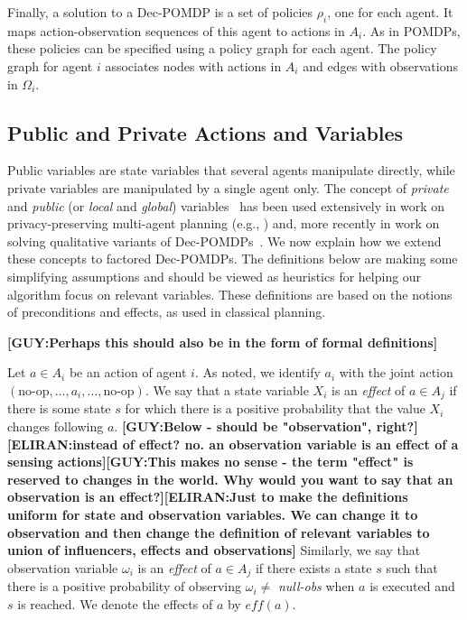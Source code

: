 \documentclass[letterpaper]{article} %
\theoremstyle{definition}
\newcommand{\eliran}[1]{\textbf{[\color{red}ELIRAN:#1]}}
\newcommand{\guy}[1]{\textbf{[\color{orange}GUY:#1]}}
\newcommand{\eff}{\mathit{eff}}
\begin{document}
Finally, a solution to a Dec-POMDP is a set of policies $\rho_i$, one for each agent. It maps action-observation sequences of this agent to actions in $A_i$.
As in POMDPs, these policies can be specified using a policy graph for each agent. The policy graph for agent $i$ associates nodes with actions in $A_i$
and edges with observations in $\Omega_i$. 



\subsection{Public and Private Actions and Variables}

Public variables are state variables that several agents manipulate directly, while private variables are manipulated by a single agent only. The concept of \emph{private} and \emph{public} (or \emph{local} and \emph{global}) variables~\cite{FACTOREDPLAN} has been used extensively
in work on privacy-preserving multi-agent planning (e.g., \cite{PRIVACYPLAN}) and, more recently in work on solving qualitative variants of Dec-POMDPs~\cite{QDECPOMDPPLAN1,QDECPOMDPPLAN2}. We now explain how we extend these concepts to factored Dec-POMDPs. The definitions below are making some simplifying assumptions and should be viewed as heuristics for helping our algorithm focus on relevant variables. These definitions are based on the notions of
preconditions and effects, as used in classical planning.

\guy{Perhaps this should also be in the form of formal definitions}

Let $a\in A_i$ be an action of agent $i$. As noted, we identify $a_i$ with the joint action $(\mbox{no-op},\ldots, a_i,\ldots,\mbox{no-op})$.
We say that a state variable $X_i$ is an {\em effect} of $a\in A_j$ if there is some state $s$ for which there is a positive probability that the value 
$X_i$ changes following $a$.
\guy{Below - should be "observation", right?}\eliran{instead of effect? no. an observation variable is an effect of a sensing actions}\guy{This makes no sense - the term "effect" is reserved to changes in the world. Why would you want to say that an observation is an effect?}\eliran{Just to make the definitions uniform for state and observation variables. We can change it to observation and then change the definition of relevant variables to union of influencers, effects and observations}
Similarly, we say that observation variable $\omega_i$ is an {\em effect} of $a\in A_j$ if there exists a state $s$ such that there is a positive probability
of observing $\omega_i \neq$ {\em null-obs} when $a$ is executed and $s$ is reached. We denote the effects of $a$ by $\eff(a)$.
\end{document}

